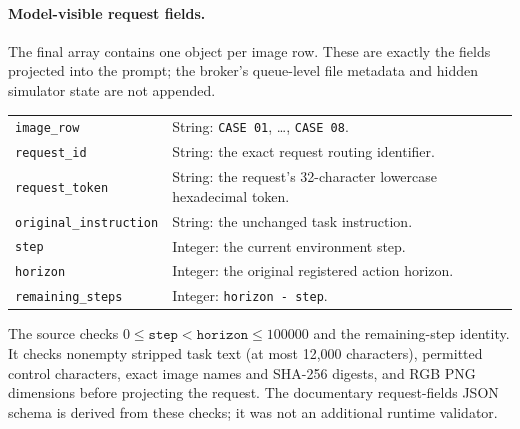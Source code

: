 \paragraph{Model-visible request fields.}
The final array contains one object per image row. These are exactly the fields projected into the prompt; the broker's queue-level file metadata and hidden simulator state are not appended.
\begin{center}\small
\begin{tabular}{ll}
\texttt{image\_row} & String: \texttt{CASE 01}, \ldots, \texttt{CASE 08}.\\
\texttt{request\_id} & String: the exact request routing identifier.\\
\texttt{request\_token} & String: the request's 32-character lowercase hexadecimal token.\\
\texttt{original\_instruction} & String: the unchanged task instruction.\\
\texttt{step} & Integer: the current environment step.\\
\texttt{horizon} & Integer: the original registered action horizon.\\
\texttt{remaining\_steps} & Integer: \texttt{horizon - step}.\\
\end{tabular}
\end{center}
The source checks $0\leq\mathtt{step}<\mathtt{horizon}\leq100000$ and the remaining-step identity. It checks nonempty stripped task text (at most 12,000 characters), permitted control characters, exact image names and SHA-256 digests, and RGB PNG dimensions before projecting the request. The documentary request-fields JSON schema is derived from these checks; it was not an additional runtime validator.

\clearpage
